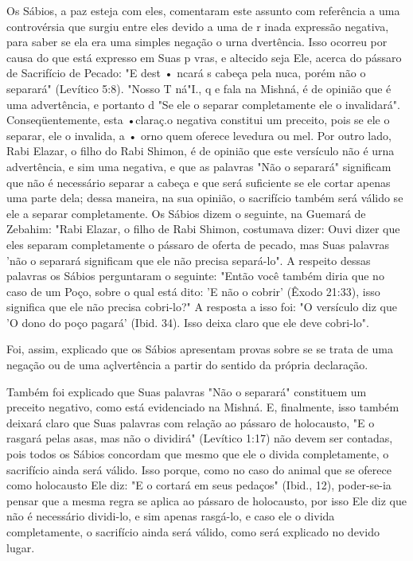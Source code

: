 \begin{itemize}
\begin{enumrate}
Os Sábios, a paz esteja com eles, comentaram este assunto com
refe­rência a uma controvérsia que surgiu entre eles devido a uma de r
inada ex­pressão negativa, para saber se ela era uma simples negação o
urna dvertên­cia. Isso ocorreu por causa do que está expresso em Suas p
vras, e altecido seja Ele, acerca do pássaro de Sacrifício de Pecado: "E
dest • ncará s cabeça pela nuca, porém não o separará" (Levítico 5:8).
"Nosso T ná"I., q e fala na Mishná, é de opinião que é
uma advertência, e portanto d "Se ele o separar completamente ele o
invalidará". Conseqüentemente, esta •claraç.o negativa
constitui um preceito, pois se ele o separar, ele o invalida, a • orno
quem oferece levedura ou mel. Por outro lado, Rabi Elazar, o filho do
Rabi Shimon, é de opinião que este versículo não é urna advertência, e
sim uma negativa, e que as palavras "Não o separará" significam que não
é necessário separar a ca­beça e que será suficiente se ele cortar
apenas uma parte dela; dessa maneira, na sua opinião, o sacrifício
também será válido se ele a separar completamente. Os Sábios dizem o
seguinte, na Guemará de Zebahim: "Rabi Elazar, o filho de Rabi Shimon,
costumava dizer: Ouvi dizer que eles separam completamente o pássaro de
oferta de pecado, mas Suas palavras 'não o separará significam que ele
não precisa separá-lo". A respeito dessas palavras os Sábios perguntaram
o seguinte: "Então você também diria que no caso de um Poço, sobre o
qual está dito: 'E não o cobrir' (Êxodo 21:33), isso significa que ele não precisa
cobri-lo?" A resposta a isso foi: "O versículo diz que 'O dono do poço
pagará' (Ibid. 34). Isso deixa claro que ele deve cobri-lo".

Foi, assim, explicado que os Sábios apresentam provas sobre se se trata
de uma negação ou de uma açlvertência a partir do sentido da própria
declaração.

Também foi explicado que Suas palavras "Não o separará" consti­tuem um
preceito negativo, como está evidenciado na Mishná. E, finalmente, isso
também deixará claro que Suas palavras com relação ao pássaro de
holo­causto, "E o rasgará pelas asas, mas não o dividirá" (Levítico
1:17) não devem ser contadas, pois todos os Sábios concordam que mesmo
que ele o divida com­pletamente, o sacrifício ainda será válido. Isso
porque, como no caso do ani­mal que se oferece como holocausto Ele diz:
"E o cortará em seus pedaços" (Ibid., 12), poder-se-ia pensar que a
mesma regra se aplica ao pássaro de holo­causto, por isso Ele diz que
não é necessário dividi-lo, e sim apenas rasgá-lo, e caso ele o divida
completamente, o sacrifício ainda será válido, como será explicado no
devido lugar.


\end{enumrate}
\end{itemize}
